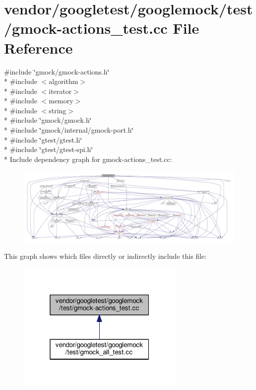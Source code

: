 \hypertarget{gmock-actions__test_8cc}{}\section{vendor/googletest/googlemock/test/gmock-\/actions\+\_\+test.cc File Reference}
\label{gmock-actions__test_8cc}
{\ttfamily \#include \char`\"{}gmock/gmock-\/actions.\+h\char`\"{}}\\*
{\ttfamily \#include $<$algorithm$>$}\\*
{\ttfamily \#include $<$iterator$>$}\\*
{\ttfamily \#include $<$memory$>$}\\*
{\ttfamily \#include $<$string$>$}\\*
{\ttfamily \#include \char`\"{}gmock/gmock.\+h\char`\"{}}\\*
{\ttfamily \#include \char`\"{}gmock/internal/gmock-\/port.\+h\char`\"{}}\\*
{\ttfamily \#include \char`\"{}gtest/gtest.\+h\char`\"{}}\\*
{\ttfamily \#include \char`\"{}gtest/gtest-\/spi.\+h\char`\"{}}\\*
Include dependency graph for gmock-\/actions\+\_\+test.cc\+:
\nopagebreak
\begin{figure}[H]
\begin{center}
\leavevmode
\includegraphics[width=350pt]{gmock-actions__test_8cc__incl}
\end{center}
\end{figure}
This graph shows which files directly or indirectly include this file\+:
\nopagebreak
\begin{figure}[H]
\begin{center}
\leavevmode
\includegraphics[width=229pt]{gmock-actions__test_8cc__dep__incl}
\end{center}
\end{figure}
